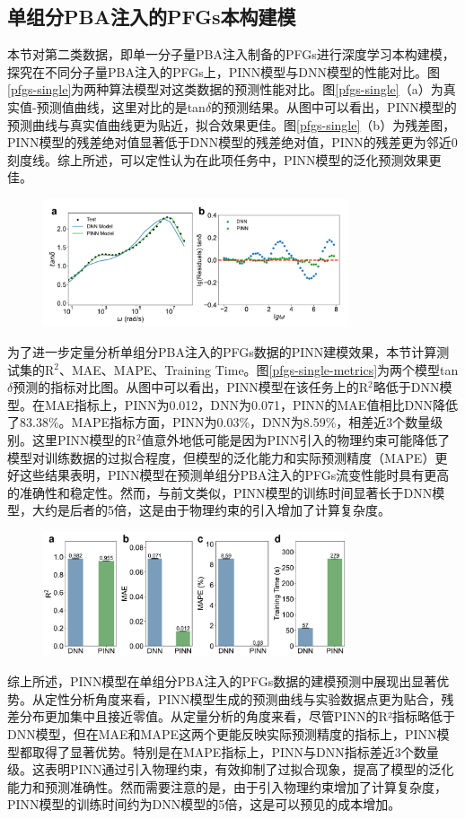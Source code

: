 \subsection{单组分PBA注入的PFGs本构建模}
本节对第二类数据，即单一分子量PBA注入制备的PFGs进行深度学习本构建模，探究在不同分子量PBA注入的PFGs上，PINN模型与DNN模型的性能对比。图\ref{pfgs-single}为两种算法模型对这类数据的预测性能对比。图\ref{pfgs-single}（a）为真实值-预测值曲线，这里对比的是tan$\delta$的预测结果。从图中可以看出，PINN模型的预测曲线与真实值曲线更为贴近，拟合效果更佳。图\ref{pfgs-single}（b）为残差图，PINN模型的残差绝对值显著低于DNN模型的残差绝对值，PINN的残差更为邻近0刻度线。综上所述，可以定性认为在此项任务中，PINN模型的泛化预测效果更佳。
\begin{figure}[htbp]
  \centering
  \includegraphics[width=0.8\textwidth]{Fig/pfgs-single.pdf}
\end{figure}
为了进一步定量分析单组分PBA注入的PFGs数据的PINN建模效果，本节计算测试集的R$^2$、MAE、MAPE、Training Time。图\ref{pfgs-single-metrics}为两个模型tan$\delta$预测的指标对比图。从图中可以看出，PINN模型在该任务上的R$^2$略低于DNN模型。在MAE指标上，PINN为0.012，DNN为0.071，PINN的MAE值相比DNN降低了83.38\%。MAPE指标方面，PINN为0.03\%，DNN为8.59\%，相差近3个数量级别。这里PINN模型的R$^2$值意外地低可能是因为PINN引入的物理约束可能降低了模型对训练数据的过拟合程度，但模型的泛化能力和实际预测精度（MAPE）更好这些结果表明，PINN模型在预测单组分PBA注入的PFGs流变性能时具有更高的准确性和稳定性。然而，与前文类似，PINN模型的训练时间显著长于DNN模型，大约是后者的5倍，这是由于物理约束的引入增加了计算复杂度。
\begin{figure}[htbp]
  \centering
  \includegraphics[width=0.8\textwidth]{Fig/pfgs-single-metrics.pdf}
\end{figure}
综上所述，PINN模型在单组分PBA注入的PFGs数据的建模预测中展现出显著优势。从定性分析角度来看，PINN模型生成的预测曲线与实验数据点更为贴合，残差分布更加集中且接近零值。从定量分析的角度来看，尽管PINN的R²指标略低于DNN模型，但在MAE和MAPE这两个更能反映实际预测精度的指标上，PINN模型都取得了显著优势。特别是在MAPE指标上，PINN与DNN指标差近3个数量级。这表明PINN通过引入物理约束，有效抑制了过拟合现象，提高了模型的泛化能力和预测准确性。然而需要注意的是，由于引入物理约束增加了计算复杂度，PINN模型的训练时间约为DNN模型的5倍，这是可以预见的成本增加。
